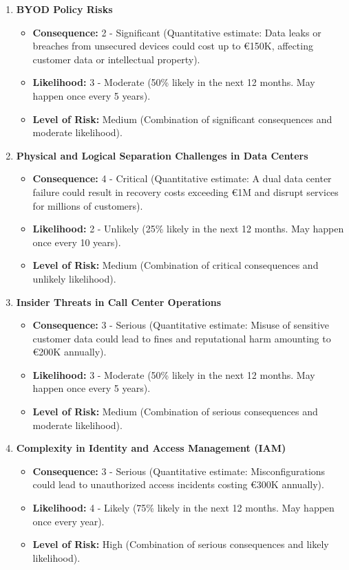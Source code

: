 \begin{enumerate}
    \item \textbf{BYOD Policy Risks}
    \begin{itemize}
        \item \textbf{Consequence:} 2 - Significant (Quantitative estimate: Data leaks or breaches from unsecured devices could cost up to €150K, affecting customer data or intellectual property).
        \item \textbf{Likelihood:} 3 - Moderate (50\% likely in the next 12 months. May happen once every 5 years).
        \item \textbf{Level of Risk:} Medium (Combination of significant consequences and moderate likelihood).
    \end{itemize}

    \item \textbf{Physical and Logical Separation Challenges in Data Centers}
    \begin{itemize}
        \item \textbf{Consequence:} 4 - Critical (Quantitative estimate: A dual data center failure could result in recovery costs exceeding €1M and disrupt services for millions of customers).
        \item \textbf{Likelihood:} 2 - Unlikely (25\% likely in the next 12 months. May happen once every 10 years).
        \item \textbf{Level of Risk:} Medium (Combination of critical consequences and unlikely likelihood).
    \end{itemize}

    \item \textbf{Insider Threats in Call Center Operations}
    \begin{itemize}
        \item \textbf{Consequence:} 3 - Serious (Quantitative estimate: Misuse of sensitive customer data could lead to fines and reputational harm amounting to €200K annually).
        \item \textbf{Likelihood:} 3 - Moderate (50\% likely in the next 12 months. May happen once every 5 years).
        \item \textbf{Level of Risk:} Medium (Combination of serious consequences and moderate likelihood).
    \end{itemize}

    \item \textbf{Complexity in Identity and Access Management (IAM)}
    \begin{itemize}
        \item \textbf{Consequence:} 3 - Serious (Quantitative estimate: Misconfigurations could lead to unauthorized access incidents costing €300K annually).
        \item \textbf{Likelihood:} 4 - Likely (75\% likely in the next 12 months. May happen once every year).
        \item \textbf{Level of Risk:} High (Combination of serious consequences and likely likelihood).
    \end{itemize}


\end{enumerate}
